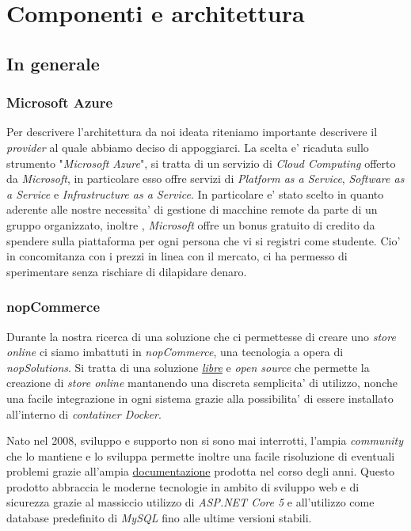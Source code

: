 \documentclass[a4paper]{report}
\begin{document}
\chapter{Componenti e architettura}
	\section{In generale}
		\subsection{Microsoft Azure}
			Per descrivere l'architettura da noi ideata riteniamo importante descrivere il \emph{provider} al quale
			abbiamo deciso di appoggiarci. La scelta e' ricaduta sullo strumento "\emph{Microsoft Azure}", si tratta
			di un servizio di \emph{Cloud Computing} offerto da \emph{Microsoft}, in particolare esso offre servizi di
			\emph{Platform as a Service}, \emph{Software as a Service} e \emph{Infrastructure as a Service}.
			In particolare e' stato scelto in quanto aderente alle nostre necessita' di gestione di macchine remote da
			parte di un gruppo organizzato, inoltre , \emph{Microsoft} offre un bonus gratuito di credito da spendere
			sulla piattaforma per ogni persona che vi si registri come studente. Cio' in concomitanza con i prezzi in
			linea con il mercato, ci ha permesso di sperimentare senza rischiare di dilapidare denaro.
		\subsection{nopCommerce}
			Durante la nostra ricerca di una soluzione che ci permettesse di creare uno \emph{store online} ci siamo
			imbattuti in \emph{nopCommerce}, una tecnologia a opera di \emph{nopSolutions}. Si tratta di una soluzione
			\href{https://github.com/nopSolutions/nopCommerce/blob/develop/LICENSE.md}{\emph{libre}} e
			\emph{open source} che permette la creazione di \emph{store online} mantanendo una discreta
			semplicita' di utilizzo, nonche una facile integrazione in ogni sistema grazie alla possibilita' di essere
			installato all'interno di \emph{contatiner Docker}.

			Nato nel 2008, sviluppo e supporto non si sono mai interrotti, l'ampia \emph{community} che lo mantiene
			e lo sviluppa permette inoltre una facile risoluzione di eventuali problemi grazie all'ampia
			\href{https://docs.nopcommerce.com/en/developer/index.html?utm_source=github&utm_medium=referral&utm_campaign=documentation&utm_content=text}{documentazione}
			prodotta nel corso degli anni. Questo prodotto abbraccia le moderne tecnologie in ambito di sviluppo web e
			di sicurezza grazie al massiccio utilizzo di \emph{ASP.NET Core 5} e all'utilizzo come database predefinito
			di \emph{MySQL} fino alle ultime versioni stabili. 
\end{document}
